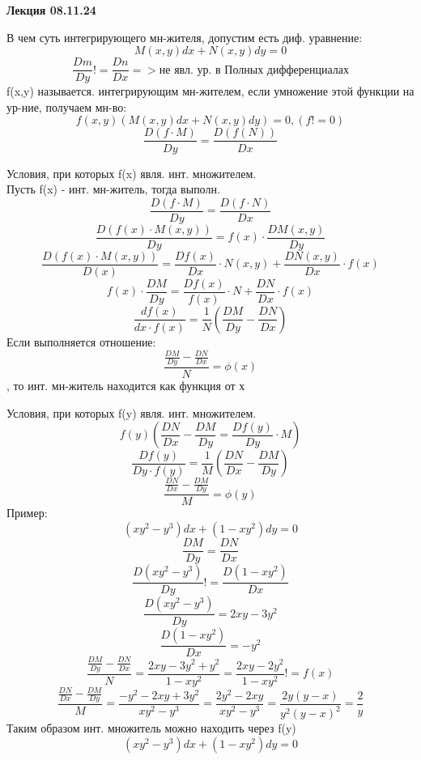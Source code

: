 \documentclass[a4paper,14pt]{extreport} %
\begin{document}
  
\begin{center}
    \textbf{Лекция 08.11.24} \\
\end{center}
В чем суть интегрирующего мн-жителя, допустим есть диф. уравнение: \[
  M(x,y)dx + N(x,y)dy = 0 \]\[ 
  \frac{Dm}{Dy} != \frac{Dn}{Dx} => \text{не явл. ур. в Полных дифференциалах}
\]
f(x,y) называется. интегрирующим мн-жителем, если умножение этой функции на ур-ние,
получаем мн-во: 
\[
  f(x,y)(M(x,y)dx + N(x,y)dy)=0,  (f!=0)
\]
\[
  \frac{D(f \cdot M)}{Dy}= \frac{D(f(N))}{Dx}
\]

Условия, при которых f(x) явля. инт. множителем. \\ 
Пусть f(x) - инт. мн-житель, тогда выполн.\[
  \frac{D(f \cdot M)}{Dy} = \frac{D(f \cdot N)}{Dx}
\]
\[
  \frac{D(f(x) \cdot M(x,y))}{Dy} = f(x) \cdot  \frac{DM(x,y)}{Dy}
\]
\[
  \frac{D(f(x) \cdot M(x,y))}{D(x)} = \frac{Df(x)}{Dx} \cdot N(x,y) + \frac{DN(x,y)}{Dx} \cdot f(x)
\]
\[
  f(x) \cdot \frac{DM}{Dy} = \frac{Df(x)}{f(x)} \cdot N + \frac{DN}{Dx} \cdot f(x)
\]
\[
  \frac{df(x)}{dx \cdot f(x)} = \frac{1}{N}(\frac{DM}{Dy} - \frac{DN}{Dx})
\]
Если выполняется отношение: \[
  \frac{\frac{DM}{Dy} - \frac{DN}{Dx}}{N}  = \phi(x)
\], то инт. мн-житель находится как функция от х

Условия, при которых f(y) явля. инт. множителем.
\[
  f(y)(\frac{DN}{Dx} - \frac{DM}{Dy} = \frac{Df(y)}{Dy} \cdot M)
\] 
\[
  \frac{Df(y)}{Dy \cdot f(y)} = \frac{1}{M}(\frac{DN}{Dx} - \frac{DM}{Dy})
\]
\[
  \frac{\frac{DN}{Dx}- \frac{DM}{Dy}}{M} = \phi(y) 
\]
Пример:
\[
  (xy^2 - y^3)dx + (1-xy^2)dy = 0
\]
\[
  \frac{DM}{Dy} = \frac{DN}{Dx}
\]
\[
  \frac{D(xy^2 - y^3)}{Dy} != \frac{D(1-xy^2)}{Dx}
\]
\[
  \frac{D(xy^2-y^3)}{Dy} = 2xy- 3y^2
\]
\[
 \frac{D(1-xy^2)}{Dx} = -y^2 
\]
\[
 \frac{\frac{DM}{Dy}- \frac{DN}{Dx}}{N} = \frac{2xy-3y^2+y^2}{1-xy^2} = \frac{2xy-2y^2}{1-xy^2} != f(x) 
\]
\[
  \frac{\frac{DN}{Dx}- \frac{DM}{Dy}}{M} = \frac{-y^2 - 2xy + 3y^2}{xy^2 - y^3}  = \frac{2y^2-2xy}{xy^2-y^3} = \frac{2y(y-x)}{y^2(y-x)^2} = \frac{2}{y}
\]
Таким образом инт. множитель можно находить через f(y)
\[
  (xy^2 - y^3)dx + (1-xy^2)dy = 0
\]
\end{document}
